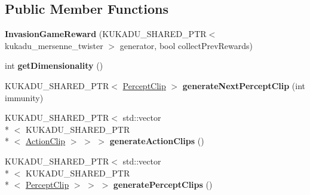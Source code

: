 \subsection*{Public Member Functions}
\begin{DoxyCompactItemize}
\item 
\hypertarget{classkukadu_1_1InvasionGameReward_aa155bb350d87b7f006165b71bf703ca7}{{\bfseries Invasion\-Game\-Reward} (K\-U\-K\-A\-D\-U\-\_\-\-S\-H\-A\-R\-E\-D\-\_\-\-P\-T\-R$<$ kukadu\-\_\-mersenne\-\_\-twister $>$ generator, bool collect\-Prev\-Rewards)}\label{classkukadu_1_1InvasionGameReward_aa155bb350d87b7f006165b71bf703ca7}

\item 
\hypertarget{classkukadu_1_1InvasionGameReward_a3cdd9b9d8e3d60295e8a6db8227ffcda}{int {\bfseries get\-Dimensionality} ()}\label{classkukadu_1_1InvasionGameReward_a3cdd9b9d8e3d60295e8a6db8227ffcda}

\item 
\hypertarget{classkukadu_1_1InvasionGameReward_ab83c35cfccb53e8547a92dac69f13005}{K\-U\-K\-A\-D\-U\-\_\-\-S\-H\-A\-R\-E\-D\-\_\-\-P\-T\-R$<$ \hyperlink{classkukadu_1_1PerceptClip}{Percept\-Clip} $>$ {\bfseries generate\-Next\-Percept\-Clip} (int immunity)}\label{classkukadu_1_1InvasionGameReward_ab83c35cfccb53e8547a92dac69f13005}

\item 
\hypertarget{classkukadu_1_1InvasionGameReward_a729d7ae52ab945b1520a9d24ee2ffba7}{K\-U\-K\-A\-D\-U\-\_\-\-S\-H\-A\-R\-E\-D\-\_\-\-P\-T\-R$<$ std\-::vector\\*
$<$ K\-U\-K\-A\-D\-U\-\_\-\-S\-H\-A\-R\-E\-D\-\_\-\-P\-T\-R\\*
$<$ \hyperlink{classkukadu_1_1ActionClip}{Action\-Clip} $>$ $>$ $>$ {\bfseries generate\-Action\-Clips} ()}\label{classkukadu_1_1InvasionGameReward_a729d7ae52ab945b1520a9d24ee2ffba7}

\item 
\hypertarget{classkukadu_1_1InvasionGameReward_a2945179e42d2cffd8c8f8bce264dcc0d}{K\-U\-K\-A\-D\-U\-\_\-\-S\-H\-A\-R\-E\-D\-\_\-\-P\-T\-R$<$ std\-::vector\\*
$<$ K\-U\-K\-A\-D\-U\-\_\-\-S\-H\-A\-R\-E\-D\-\_\-\-P\-T\-R\\*
$<$ \hyperlink{classkukadu_1_1PerceptClip}{Percept\-Clip} $>$ $>$ $>$ {\bfseries generate\-Percept\-Clips} ()}\label{classkukadu_1_1InvasionGameReward_a2945179e42d2cffd8c8f8bce264dcc0d}

\end{DoxyCompactItemize}
